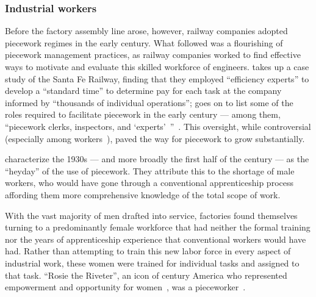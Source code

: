 \documentclass[trackingWork]{subfiles}
\begin{document}
\subsubsection{Industrial workers}
Before the factory assembly line arose, however, railway companies adopted piecework regimes in the early  century.
What followed was a flourishing of piecework management practices,
as railway companies worked to find effective ways
to motivate and evaluate this skilled workforce of engineers.
\citeauthor{10.2307/23702539} takes up a case study of the Santa Fe Railway,
finding that they employed ``efficiency experts'' to develop a ``standard time''
to determine pay for each task at the company informed by
``thousands of individual operations''; %
\citeauthor{10.2307/23702539} goes on to list
some of the roles required to facilitate piecework
in the early  century
--- among them, ``piecework clerks, inspectors, and `experts'~''~\cite{10.2307/23702539}.
This oversight, while controversial
(especially among workers~\cite{american1921problem}),
paved the way for piecework to grow substantially.

\citeauthor{hart2013rise} characterize the 1930s
--- and more broadly the first half of the  century ---
as the ``heyday'' of the use of piecework.
They attribute this to the shortage of male workers,
who would have gone through a conventional apprenticeship process
affording them more comprehensive knowledge of the total scope of work.

With the vast majority of men drafted into service,
factories found themselves turning to
a predominantly female workforce that had neither
the formal training nor
the years of apprenticeship experience
that conventional workers would have had.
Rather than attempting to train this new labor force in every aspect of industrial work,
these women were trained for individual tasks
and assigned to that task.
``Rosie the Riveter'',
an icon of  century America who
represented empowerment and opportunity for women~\cite{honey1985creating},
was a pieceworker~\cite{davies2014origins}.


\begin{comment}
What did I pull from the threads that are related to industrial and railroad workers (i.e. 1920 onward?)

- Graves: railway companies used ``efficiency experts'' to study how long tasks should take
- Hart: evaluation limits complexity (we can affect that with peer evaluation!)
- Graves: sparks of Scientific Management in Piecework
- organization types are important determinants of piecework viability: lots of types of tasks? bad
  - Hart (I think?): variability in *worker* quality is fine
- Foreman is important
- Worker advocacy groups arose to speak out against piecework

\end{comment}
\end{document}

